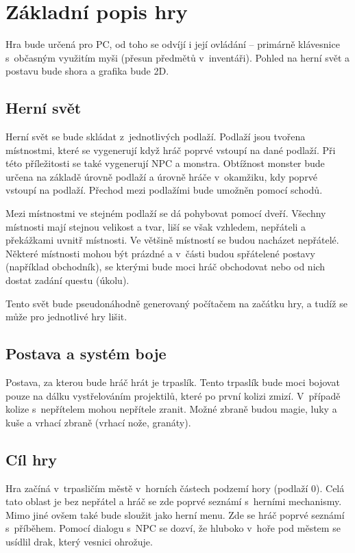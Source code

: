 \documentclass[12pt,a4paper]{article}
\begin{document}

\section{Základní popis hry}
Hra bude určená pro PC, od toho se odvíjí i její ovládání -- primárně klávesnice
s~občasným využitím myši (přesun předmětů v~inventáři). Pohled na herní svět a
postavu bude shora a grafika bude 2D.

\subsection{Herní svět}
Herní svět se bude skládat z~jednotlivých podlaží. Podlaží jsou tvořena
místnostmi, které se vygenerují když hráč poprvé vstoupí na dané podlaží. Při
této příležitosti se také vygenerují NPC a monstra. Obtížnost monster bude
určena na základě úrovně podlaží a úrovně hráče v~okamžiku, kdy poprvé vstoupí
na podlaží. Přechod mezi podlažími bude umožněn pomocí schodů.

Mezi místnostmi ve stejném podlaží se dá pohybovat pomocí dveří. Všechny
místnosti mají stejnou velikost a tvar, liší se však vzhledem, nepřáteli a
překážkami uvnitř místnosti. Ve většině místností se budou nacházet nepřátelé.
Některé místnosti mohou být prázdné a v~části budou spřátelené postavy (například
obchodník), se kterými bude moci hráč obchodovat nebo od nich dostat zadání
questu (úkolu).

Tento svět bude pseudonáhodně generovaný počítačem na začátku hry, a tudíž se
může pro jednotlivé hry lišit.

\subsection{Postava a systém boje}
Postava, za kterou bude hráč hrát je trpaslík. Tento trpaslík bude moci bojovat
pouze na dálku vystřelováním projektilů, které po první kolizi zmizí. V~případě
kolize s~nepřítelem mohou nepřítele zranit. Možné zbraně budou magie, luky a
kuše a vrhací zbraně (vrhací nože, granáty).

\subsection{Cíl hry}
Hra začíná v~trpasličím městě v~horních částech podzemí hory (podlaží 0).
Celá tato oblast je bez nepřátel a hráč se zde poprvé seznámí s~herními
mechanismy.  Mimo  jiné ovšem také bude sloužit jako herní menu.
Zde se hráč poprvé seznámí s~příběhem. Pomocí dialogu s~NPC se dozví,
že hluboko v~hoře pod městem se usídlil drak, který vesnici ohrožuje.
\end{document}
